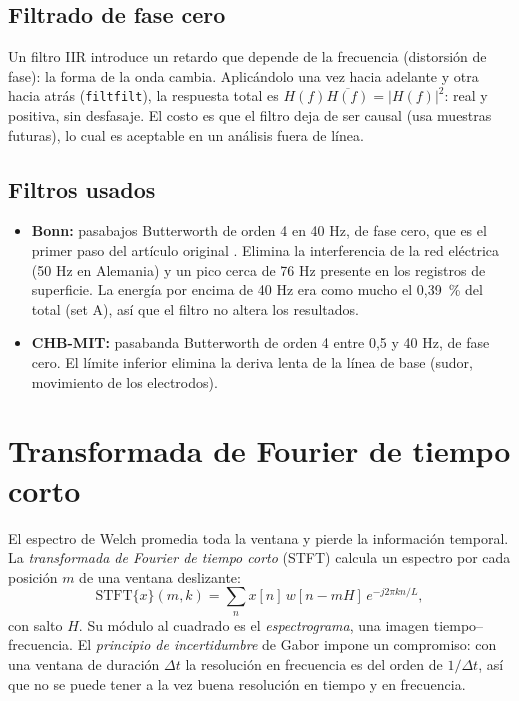 \subsection{Filtrado de fase cero}

Un filtro IIR introduce un retardo que depende de la frecuencia (distorsión de fase): la forma de la
onda cambia. Aplicándolo una vez hacia adelante y otra hacia atrás (\texttt{filtfilt}), la respuesta
total es $H(f)\overline{H(f)} = |H(f)|^2$: real y positiva, sin desfasaje. El costo es que el filtro deja
de ser causal (usa muestras futuras), lo cual es aceptable en un análisis fuera de línea.

\subsection{Filtros usados}

\begin{itemize}
  \item \textbf{Bonn:} pasabajos Butterworth de orden 4 en 40 Hz, de fase cero, que es el primer paso del
        artículo original \parencite{andrzejak2001}. Elimina la interferencia de la red eléctrica (50 Hz en
        Alemania) y un pico cerca de 76 Hz presente en los registros de superficie. La energía por encima de
        40 Hz era como mucho el 0,39~\% del total (set A), así que el filtro no altera los resultados.
  \item \textbf{CHB-MIT:} pasabanda Butterworth de orden 4 entre 0,5 y 40 Hz, de fase cero. El límite
        inferior elimina la deriva lenta de la línea de base (sudor, movimiento de los electrodos).
\end{itemize}

\section{Transformada de Fourier de tiempo corto}

El espectro de Welch promedia toda la ventana y pierde la información temporal. La \emph{transformada de
Fourier de tiempo corto} (STFT) calcula un espectro por cada posición $m$ de una ventana deslizante:
\begin{equation}
  \mathrm{STFT}\{x\}(m, k) = \sum_{n} x[n]\, w[n - mH]\, e^{-j2\pi kn/L},
\end{equation}
con salto $H$. Su módulo al cuadrado es el \emph{espectrograma}, una imagen tiempo--frecuencia. El
\emph{principio de incertidumbre} de Gabor impone un compromiso: con una ventana de duración $\Delta t$ la
resolución en frecuencia es del orden de $1/\Delta t$, así que no se puede tener a la vez buena resolución
en tiempo y en frecuencia.

